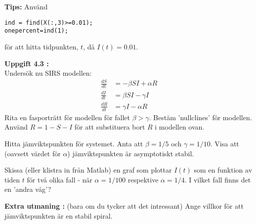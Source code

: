 \textbf{Tips:} Använd
\begin{lstlisting}
ind = find(X(:,3)>=0.01);
onepercent=ind(1);
\end{lstlisting}
för att hitta tidpunkten, $t$, då $I(t)=0.01$.
 

\textbf{Uppgift 4.3 :}\\
Undersök nu SIRS modellen:
\[
\begin{aligned}
\frac{dS}{dt} & = - \beta S I + \alpha R\\
\frac{dI}{dt} & = \beta S I  -  \gamma I \\
\frac{dR}{dt} & =  \gamma I - \alpha R
\end{aligned}
\]
Rita en fasporträtt för modellen för fallet $\beta>\gamma$. Bestäm 'nullclines' för modellen. Använd $R=1-S-I$ för att substituera bort $R$ i modellen ovan.


Hitta jämviktspunkten för systemet. Anta att $\beta=1/5$ och $\gamma =1/10$. Visa att (oavsett värdet för $\alpha$) jämviktspunkten är asymptotiskt stabil. 


Skissa (eller klistra in från Matlab) en graf som plottar $I(t)$ som en funktion av tiden $t$ för två olika fall - när $\alpha=1/100$ respektive $\alpha=1/4$. I vilket fall finns det en 'andra våg'?

 

{ \bf Extra utmaning :} (bara om du tycker att det intressant) Ange villkor för att jämviktspunkten är en stabil spiral. 


